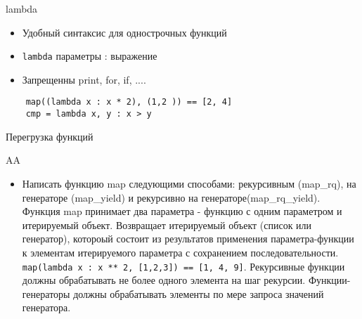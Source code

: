 \documentclass{article}
\begin{document}
\begin{center} lambda \end{center}
\begin{itemize}
    \item Удобный синтаксис для однострочных функций
    \item \lstinline!lambda! параметры : выражение
    \item Запрещенны print, for, if, ....
\end{itemize}
\vspace{15pt}
\begin{lstlisting}
    map((lambda x : x * 2), (1,2 )) == [2, 4]
    cmp = lambda x, y : x > y
\end{lstlisting}
\newpage

\begin{center} Перегрузка функций \end{center}
\newpage

\begin{center} AA \end{center}
\begin{itemize}
    \item Написать функцию map следующими способами: рекурсивным (map\_rq), 
        на генераторе (map\_yield) и рекурсивно на генераторе(map\_rq\_yield).
        Функция map принимает два параметра - функцию с одним параметром и итерируемый объект. 
        Возвращает итерируемый объект (список или генератор), котороый состоит из результатов
        применения параметра-функции к элементам итерируемого параметра с сохранением последовательности.
        \lstinline!map(lambda x : x ** 2, [1,2,3]) == [1, 4, 9]!.
        Рекурсивные функции должны обрабатывать не более одного элемента на шаг рекурсии.
        Функции-генераторы должны обрабатывать элементы по мере запроса значений генератора.
\end{itemize}
\newpage
\end{document}
